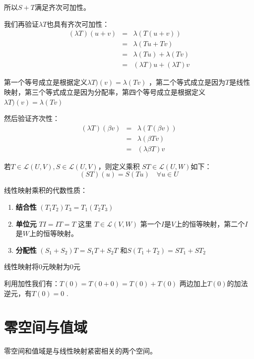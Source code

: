 \documentclass[10pt,a4paper,UTF8]{article}
\begin{document}
所以\(S+T\)满足齐次可加性。

我们再验证\(\lambda T\)也具有齐次可加性：
\begin{eqnarray*}
(\lambda T)(u+v)&=& \lambda (T(u+v)) \\
&=& \lambda (Tu + Tv) \\
&=& \lambda (Tu) + \lambda (Tv) \\
&=& (\lambda T) u + (\lambda T)v
\end{eqnarray*}

第一个等号成立是根据定义\(\lambda T)(v) = \lambda (Tv)\) ，第二个等式成立是因为\(T\)是线性映射，第三个等式成立是因为分配率，第四个等号成立是根据定义\(\lambda T)(v) = \lambda (Tv)\)

然后验证齐次性：
\begin{eqnarray*}
(\lambda T)(\beta v)&=& \lambda(T(\beta v)) \\
&=& \lambda (\beta Tv) \\
&=& (\lambda \beta T) v
\end{eqnarray*}

\begin{definition}
若\(T \in \mathcal{L}(U,V), S \in \mathcal{L}(U,V)\)，则定义乘积 \(ST \in \mathcal{L}(U,W)\)如下： \[(ST)(u) = S(Tu) \quad \forall u\in U\]
\end{definition}

线性映射乘积的代数性质：
\begin{enumerate}
\item \textbf{结合性} \((T_{1}T_{2})T_{3} = T_{1}(T_{2}T_{3})\)
\item \textbf{单位元} \(TI = IT = T\) 这里 \(T \in \mathcal{L}(V,W)\) 第一个\(I\)是\(V\)上的恒等映射，第二个\(I\)是\(W\)上的恒等映射。
\item \textbf{分配性} \((S_{1}+S_{2})T = S_{1} T + S_{2}T\) 和\(S(T_{1} + T_{2}) = ST_{1} + ST_{2}\)
\end{enumerate}

\begin{theorem}
线性映射将\(0\)元映射为\(0\)元
\end{theorem}

利用加性我们有：\(T(0) = T(0+0) = T(0) + T(0)\) 两边加上\(T(0)\)的加法逆元，有\(T(0) = 0\) .

\section{零空间与值域}
\label{sec:org73c79f6}


零空间和值域是与线性映射紧密相关的两个空间。
\end{document}
